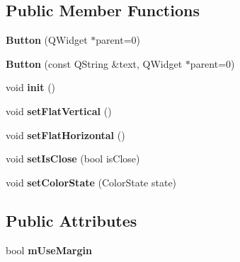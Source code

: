 \subsection*{Public Member Functions}
\begin{DoxyCompactItemize}
\item 
\hypertarget{class_button_a87565544cd9fbee675f6b6d61a319efd}{{\bfseries Button} (Q\-Widget $\ast$parent=0)}\label{class_button_a87565544cd9fbee675f6b6d61a319efd}

\item 
\hypertarget{class_button_af2d87c16e6fb26ed7a1840f85c2cae2a}{{\bfseries Button} (const Q\-String \&text, Q\-Widget $\ast$parent=0)}\label{class_button_af2d87c16e6fb26ed7a1840f85c2cae2a}

\item 
\hypertarget{class_button_a3bcee333474dfe20a2f30cc0b4f9dbba}{void {\bfseries init} ()}\label{class_button_a3bcee333474dfe20a2f30cc0b4f9dbba}

\item 
\hypertarget{class_button_affdb0e2680831b91667c5191f0799d1c}{void {\bfseries set\-Flat\-Vertical} ()}\label{class_button_affdb0e2680831b91667c5191f0799d1c}

\item 
\hypertarget{class_button_a662e30d596c867e7e3d63b4b846df232}{void {\bfseries set\-Flat\-Horizontal} ()}\label{class_button_a662e30d596c867e7e3d63b4b846df232}

\item 
\hypertarget{class_button_a03d2aa84cf3f9a7cc9dbd575f530ca67}{void {\bfseries set\-Is\-Close} (bool is\-Close)}\label{class_button_a03d2aa84cf3f9a7cc9dbd575f530ca67}

\item 
\hypertarget{class_button_a223df75cba6d3f4eba617f55fbc2edbc}{void {\bfseries set\-Color\-State} (Color\-State state)}\label{class_button_a223df75cba6d3f4eba617f55fbc2edbc}

\end{DoxyCompactItemize}
\subsection*{Public Attributes}
\begin{DoxyCompactItemize}
\item 
\hypertarget{class_button_a5438501c7a96888a34344cf06638b790}{bool {\bfseries m\-Use\-Margin}}\label{class_button_a5438501c7a96888a34344cf06638b790}

\end{DoxyCompactItemize}
